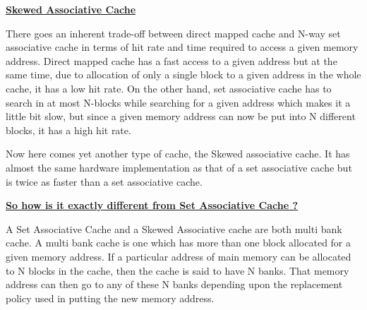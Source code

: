 \documentclass[12pt]{article}
\begin{document}
{\fontsize{24pt}{28.8pt}\selectfont \textbf{\textcolor[HTML]{0C343D}{\uline{Skewed Associative Cache}}}\par}\par


\vspace{\baselineskip}
{\fontsize{14pt}{16.8pt}\selectfont There goes an inherent trade-off between direct mapped cache and N-way set associative cache in terms of hit rate and time required to access a given memory address. Direct mapped cache has a fast access to a given address but at the same time, due to allocation of only a single block to a given address in the whole cache, it has a low hit rate. On the other hand, set associative cache has to search in at most N-blocks while searching for a given address which makes it a little bit slow, but since a given memory address can now be put into N different blocks, it has a high hit rate.\par}\par


\vspace{\baselineskip}
{\fontsize{14pt}{16.8pt}\selectfont Now here comes yet another type of cache, the Skewed associative cache. It has almost the same hardware implementation as that of a set associative cache but is twice as faster than a set associative cache.\par}\par


\vspace{\baselineskip}

\vspace{\baselineskip}

\vspace{\baselineskip}

\vspace{\baselineskip}
{\fontsize{24pt}{28.8pt}\selectfont \textbf{\textcolor[HTML]{0C343D}{\uline{So how is it exactly different from Set Associative Cache ?}}}\par}\par


\vspace{\baselineskip}
{\fontsize{14pt}{16.8pt}\selectfont A Set Associative Cache and a Skewed Associative cache are both multi bank cache. A multi bank cache is one which has more than one block allocated for a given memory address. If a particular address of main memory can be allocated to N blocks in the cache, then the cache is said to have N banks. That memory address can then go to any of these N banks depending upon the replacement policy used in putting the new memory address.\par}\par
\end{document}
